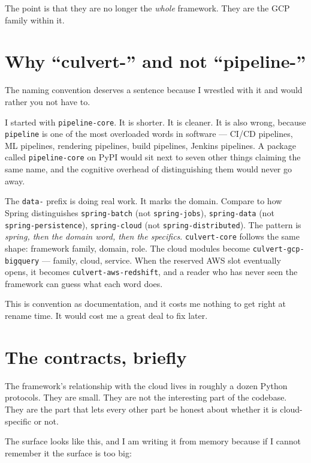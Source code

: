 \documentclass[
  11pt,
  british,
  oneside]{book}
\begin{document}
The point is that they are no longer the \emph{whole} framework. They
are the GCP family within it.

\hypertarget{why-culvert--and-not-pipeline-}{%
\section{Why ``culvert-'' and not
``pipeline-''}\label{why-culvert--and-not-pipeline-}}

The naming convention deserves a sentence because I wrestled with it and
would rather you not have to.

I started with \texttt{pipeline-core}. It is shorter. It is cleaner. It
is also wrong, because \texttt{pipeline} is one of the most overloaded
words in software --- CI/CD pipelines, ML pipelines, rendering
pipelines, build pipelines, Jenkins pipelines. A package called
\texttt{pipeline-core} on PyPI would sit next to seven other things
claiming the same name, and the cognitive overhead of distinguishing
them would never go away.

The \texttt{data-} prefix is doing real work. It marks the domain.
Compare to how Spring distinguishes \texttt{spring-batch} (not
\texttt{spring-jobs}), \texttt{spring-data} (not
\texttt{spring-persistence}), \texttt{spring-cloud} (not
\texttt{spring-distributed}). The pattern is \emph{spring, then the
domain word, then the specifics}. \texttt{culvert-core} follows the same
shape: framework family, domain, role. The cloud modules become
\texttt{culvert-gcp-bigquery} --- family, cloud, service. When the
reserved AWS slot eventually opens, it becomes
\texttt{culvert-aws-redshift}, and a reader who has never seen the
framework can guess what each word does.

This is convention as documentation, and it costs me nothing to get
right at rename time. It would cost me a great deal to fix later.

\hypertarget{the-contracts-briefly}{%
\section{The contracts, briefly}\label{the-contracts-briefly}}

The framework's relationship with the cloud lives in roughly a dozen
Python protocols. They are small. They are not the interesting part of
the codebase. They are the part that lets every other part be honest
about whether it is cloud-specific or not.

The surface looks like this, and I am writing it from memory because if
I cannot remember it the surface is too big:
\end{document}
